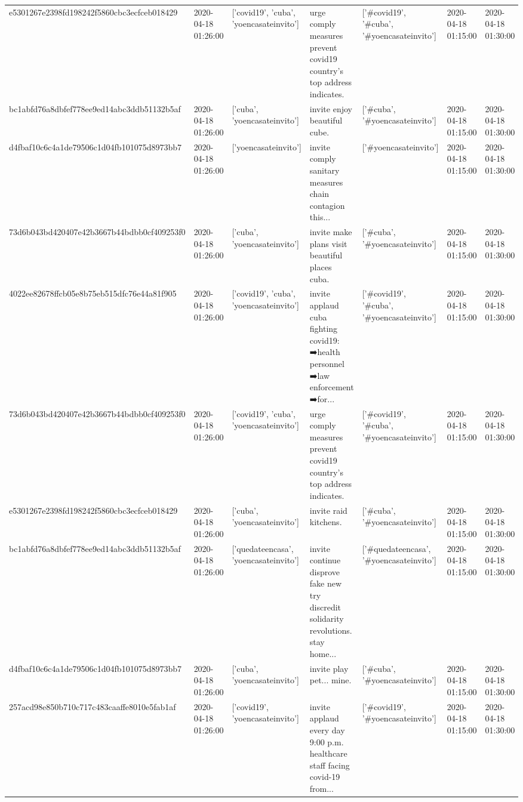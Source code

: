 \begin{tabular}{lllllll}
e5301267e2398fd198242f5860cbc3ecfceb018429 & 2020-04-18 01:26:00 & ['covid19', 'cuba', 'yoencasateinvito'] & urge comply measures prevent covid19 country's top address indicates. & ['#covid19', '#cuba', '#yoencasateinvito'] & 2020-04-18 01:15:00 & 2020-04-18 01:30:00 \\
bc1abfd76a8dbfef778ee9ed14abc3ddb51132b5af & 2020-04-18 01:26:00 & ['cuba', 'yoencasateinvito'] & invite enjoy beautiful cube. & ['#cuba', '#yoencasateinvito'] & 2020-04-18 01:15:00 & 2020-04-18 01:30:00 \\
d4fbaf10c6c4a1de79506c1d04fb101075d8973bb7 & 2020-04-18 01:26:00 & ['yoencasateinvito'] & invite comply sanitary measures chain contagion this... & ['#yoencasateinvito'] & 2020-04-18 01:15:00 & 2020-04-18 01:30:00 \\
73d6b043bd420407e42b3667b44bdbb0cf409253f0 & 2020-04-18 01:26:00 & ['cuba', 'yoencasateinvito'] & invite make plans visit beautiful places cuba. & ['#cuba', '#yoencasateinvito'] & 2020-04-18 01:15:00 & 2020-04-18 01:30:00 \\
4022ee82678ffcb05e8b75eb515dfc76e44a81f905 & 2020-04-18 01:26:00 & ['covid19', 'cuba', 'yoencasateinvito'] & invite applaud cuba fighting covid19: ➡️health personnel ➡️law enforcement ➡️for... & ['#covid19', '#cuba', '#yoencasateinvito'] & 2020-04-18 01:15:00 & 2020-04-18 01:30:00 \\
73d6b043bd420407e42b3667b44bdbb0cf409253f0 & 2020-04-18 01:26:00 & ['covid19', 'cuba', 'yoencasateinvito'] & urge comply measures prevent covid19 country's top address indicates. & ['#covid19', '#cuba', '#yoencasateinvito'] & 2020-04-18 01:15:00 & 2020-04-18 01:30:00 \\
e5301267e2398fd198242f5860cbc3ecfceb018429 & 2020-04-18 01:26:00 & ['cuba', 'yoencasateinvito'] & invite raid kitchens. & ['#cuba', '#yoencasateinvito'] & 2020-04-18 01:15:00 & 2020-04-18 01:30:00 \\
bc1abfd76a8dbfef778ee9ed14abc3ddb51132b5af & 2020-04-18 01:26:00 & ['quedateencasa', 'yoencasateinvito'] & invite continue disprove fake new try discredit solidarity revolutions. stay home... & ['#quedateencasa', '#yoencasateinvito'] & 2020-04-18 01:15:00 & 2020-04-18 01:30:00 \\
d4fbaf10c6c4a1de79506c1d04fb101075d8973bb7 & 2020-04-18 01:26:00 & ['cuba', 'yoencasateinvito'] & invite play pet... mine. & ['#cuba', '#yoencasateinvito'] & 2020-04-18 01:15:00 & 2020-04-18 01:30:00 \\
257acd98e850b710c717c483caaffe8010e5fab1af & 2020-04-18 01:26:00 & ['covid19', 'yoencasateinvito'] & invite applaud every day 9:00 p.m. healthcare staff facing covid-19 from... & ['#covid19', '#yoencasateinvito'] & 2020-04-18 01:15:00 & 2020-04-18 01:30:00 \\

\end{tabular}
